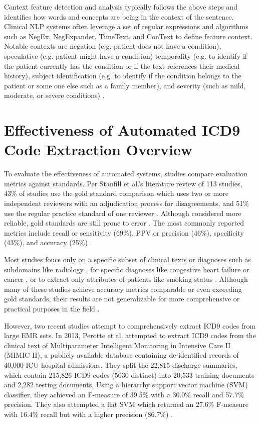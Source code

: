 \documentclass[sigconf]{acmart}
\begin{document}
Context feature detection and analysis typically follows the above steps and identifies how words and concepts are being in the context of the sentence. Clinical NLP systems often leverage a set of regular expressions and algorithms such as NegEx, NegExpander, TimeText, and ConText to define feature context. Notable contexts are negation (e.g. patient does not have a condition), speculative (e.g. patient might have a condition) temporality (e.g. to identify if the patient currently has the condition or if the text references their medical history), subject identification (e.g. to identify if the condition belongs to the patient or some one else such as a family member), and severity (such as mild, moderate, or severe conditions) \cite{meystre2008extracting}\cite{velupillai2015recent}.



\section{Effectiveness of Automated ICD9 Code Extraction Overview}
To evaluate the effectiveness of automated systems, studies compare evaluation metrics against standards. Per Stanfill et al.'s literature review of 113 studies, 43\% of studies use the gold standard comparison which uses two or more independent reviewers with an adjudication process for disagreements, and 51\% use the regular practice standard of one reviewer \cite{stanfill2010systematic}. Although considered more reliable, gold standards are still prone to error \cite{perotte2013diagnosis}. The most commonly reported metrics include recall or sensitivity (69\%), PPV or precision (46\%), specificity (43\%), and accuracy (25\%) \cite{stanfill2010systematic}.

Most studies foucs only on a specific subset of clinical texts or diagnoses such as subdomains like radiology \cite{pons2016natural}, for specific diagnoses like congestive heart failure \cite{friedlin2006natural} or cancer \cite{mamlin2003automated}, or to extract only attributes of patients like smoking status \cite{uzuner2008identifying}. Although many of these studies achieve accuracy metrics comparable or even exceeding gold standards, their results are not generalizable for more comprehensive or practical purposes in the field \cite{stanfill2010systematic}.

However, two recent studies attempt to comprehensively extract ICD9 codes from large EMR sets. In 2013, Perotte et al. attempted to extract ICD9 codes from the clinical text of Multiparameter Intelligent Monitoring in Intensive Care II (MIMIC II), a publicly available database containing de-identified records of 40,000 ICU hospital admissions. They split the 22,815 discharge summaries, which contain 215,826 ICD9 codes (5030 distinct) into 20,533 training documents and 2,282 testing documents. Using a hierarchy support vector machine (SVM) classifier, they achieved an F-measure of 39.5\% with a 30.0\% recall and 57.7\% precision. They also attempted a flat SVM which returned an 27.6\% F-measure with 16.4\% recall but with a higher precision (86.7\%) \cite{perotte2013diagnosis}.
\end{document}
